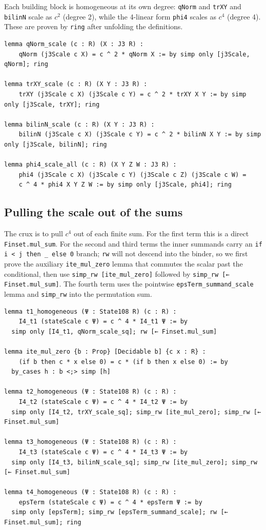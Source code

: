 \documentclass[11pt]{article}
\theoremstyle{definition}
\begin{document}
Each building block is homogeneous at its own degree: \texttt{qNorm} and
\texttt{trXY} and \texttt{bilinN} scale as $c^2$ (degree 2), while the 4-linear
form \texttt{phi4} scales as $c^4$ (degree 4). These are proven by
\texttt{ring} after unfolding the definitions.

\begin{lstlisting}[language=leanL,caption={Scaling sub-lemmas (GKN\_I4\_State108.lean).}]
lemma qNorm_scale (c : R) (X : J3 R) :
    qNorm (j3Scale c X) = c ^ 2 * qNorm X := by simp only [j3Scale, qNorm]; ring

lemma trXY_scale (c : R) (X Y : J3 R) :
    trXY (j3Scale c X) (j3Scale c Y) = c ^ 2 * trXY X Y := by simp only [j3Scale, trXY]; ring

lemma bilinN_scale (c : R) (X Y : J3 R) :
    bilinN (j3Scale c X) (j3Scale c Y) = c ^ 2 * bilinN X Y := by simp only [j3Scale, bilinN]; ring

lemma phi4_scale_all (c : R) (X Y Z W : J3 R) :
    phi4 (j3Scale c X) (j3Scale c Y) (j3Scale c Z) (j3Scale c W) =
    c ^ 4 * phi4 X Y Z W := by simp only [j3Scale, phi4]; ring
\end{lstlisting}

\subsection{Pulling the scale out of the sums}
\label{sec:state108-sums}

The crux is to pull $c^4$ out of each finite sum. For the first term this is a
direct \texttt{Finset.mul\_sum}. For the second and third terms the inner
summands carry an \texttt{if i < j then \_ else 0} branch; \texttt{rw} will not
descend into the binder, so we first prove the auxiliary
\texttt{ite\_mul\_zero} lemma that commutes the scalar past the conditional,
then use \texttt{simp\_rw [ite\_mul\_zero]} followed by
\texttt{simp\_rw [← Finset.mul\_sum]}. The fourth term uses the pointwise
\texttt{epsTerm\_summand\_scale} lemma and \texttt{simp\_rw} into the
permutation sum.

\begin{lstlisting}[language=leanL,caption={Homogeneity of each term
  (GKN\_I4\_State108.lean).}]
lemma t1_homogeneous (Ψ : State108 R) (c : R) :
    I4_t1 (stateScale c Ψ) = c ^ 4 * I4_t1 Ψ := by
  simp only [I4_t1, qNorm_scale_sq]; rw [← Finset.mul_sum]

lemma ite_mul_zero {b : Prop} [Decidable b] {c x : R} :
    (if b then c * x else 0) = c * (if b then x else 0) := by
  by_cases h : b <;> simp [h]

lemma t2_homogeneous (Ψ : State108 R) (c : R) :
    I4_t2 (stateScale c Ψ) = c ^ 4 * I4_t2 Ψ := by
  simp only [I4_t2, trXY_scale_sq]; simp_rw [ite_mul_zero]; simp_rw [← Finset.mul_sum]

lemma t3_homogeneous (Ψ : State108 R) (c : R) :
    I4_t3 (stateScale c Ψ) = c ^ 4 * I4_t3 Ψ := by
  simp only [I4_t3, bilinN_scale_sq]; simp_rw [ite_mul_zero]; simp_rw [← Finset.mul_sum]

lemma t4_homogeneous (Ψ : State108 R) (c : R) :
    epsTerm (stateScale c Ψ) = c ^ 4 * epsTerm Ψ := by
  simp only [epsTerm]; simp_rw [epsTerm_summand_scale]; rw [← Finset.mul_sum]; ring
\end{lstlisting}
\end{document}
